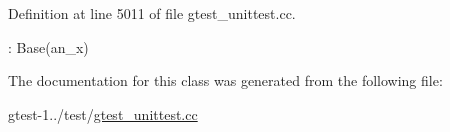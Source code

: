\-Definition at line 5011 of file gtest\-\_\-unittest.\-cc.


\begin{DoxyCode}
: Base(an_x) {}
\end{DoxyCode}


\-The documentation for this class was generated from the following file\-:\begin{DoxyCompactItemize}
\item 
gtest-\/1../test/\hyperlink{gtest__unittest_8cc}{gtest\-\_\-unittest.\-cc}\end{DoxyCompactItemize}
